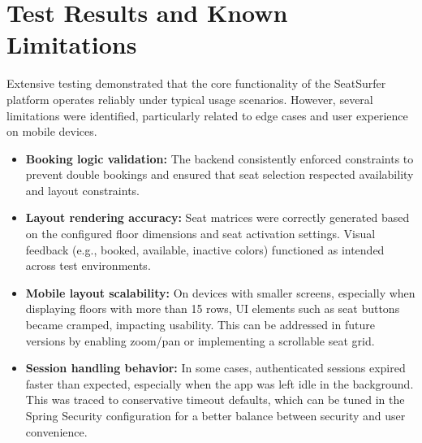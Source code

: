 \documentclass[12pt,a4paper]{report}
\begin{document}


\section{Test Results and Known Limitations}

Extensive testing demonstrated that the core functionality of the SeatSurfer platform operates reliably under typical usage scenarios. However, several limitations were identified, particularly related to edge cases and user experience on mobile devices.

\begin{itemize}
    \item \textbf{Booking logic validation:} The backend consistently enforced constraints to prevent double bookings and ensured that seat selection respected availability and layout constraints.
    
    \item \textbf{Layout rendering accuracy:} Seat matrices were correctly generated based on the configured floor dimensions and seat activation settings. Visual feedback (e.g., booked, available, inactive colors) functioned as intended across test environments.

    \item \textbf{Mobile layout scalability:} On devices with smaller screens, especially when displaying floors with more than 15 rows, UI elements such as seat buttons became cramped, impacting usability. This can be addressed in future versions by enabling zoom/pan or implementing a scrollable seat grid.

    \item \textbf{Session handling behavior:} In some cases, authenticated sessions expired faster than expected, especially when the app was left idle in the background. This was traced to conservative timeout defaults, which can be tuned in the Spring Security configuration for a better balance between security and user convenience.
\end{itemize}
\end{document}
